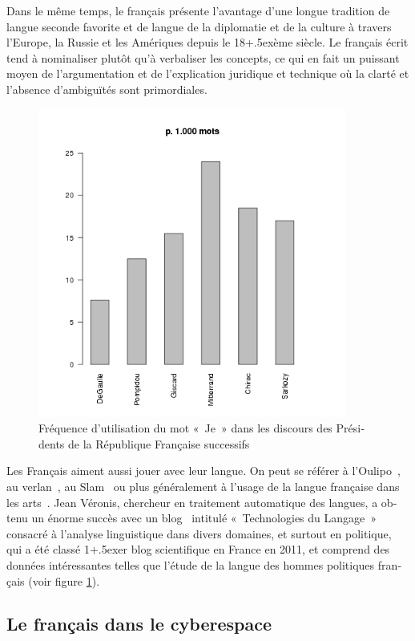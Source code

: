 \begin{french}
\begin{multicols}{2}
Dans le même temps, le français présente l'avantage d'une
longue tradition de langue seconde favorite et de langue de la
diplomatie et de la culture à travers l'Europe, la Russie et
les Amériques depuis le 18\raise+.5ex\hbox{ème} siècle. Le français
écrit tend à nominaliser plutôt qu'à verbaliser les concepts,
ce qui en fait un puissant moyen de l'argumentation et de
l'explication juridique et technique où la clarté et l'absence d'ambiguïtés sont primordiales.
%
\begin{figure}[t]
\begin{center}
 \includegraphics[height=4.0in]{_media/french/je_freq.png} 
  \caption{Fréquence d'utilisation du mot «~Je~» dans les discours des Présidents de la République Française successifs}
  \label{fig:je_stats}
\end{center}
\end{figure}
%
Les Français aiment aussi jouer avec leur langue. On peut se référer à
l'Oulipo~\cite{oulipo}, au verlan~\cite{plenat95}, au
Slam~\cite{slam} ou plus généralement à l'usage de la langue
française dans les arts~\cite{arts}. Jean Véronis, chercheur en
traitement automatique des langues, a obtenu un énorme succès avec un
blog~\cite{veronis} intitulé «~Technologies du Langage~» consacré à
l'analyse linguistique dans divers domaines, et surtout en
politique, qui a été classé 1\raise+.5ex\hbox{er} blog scientifique en
France en 2011, et comprend des données intéressantes telles que
l'étude de la langue des hommes politiques français (voir
figure \ref{fig:je_stats}).



\subsection{Le français dans le cyberespace}


\end{multicols}
\end{french}
